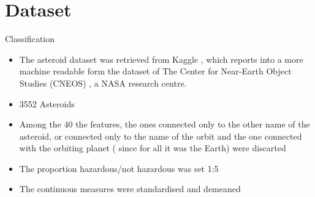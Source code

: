\documentclass{beamer}
\begin{document}
\section{Dataset}

\begin{frame}{Classification}
\begin{itemize}


\item The asteroid dataset was retrieved from Kaggle \cite{kaggle_dataset}, which reports into a more machine readable form the dataset of The Center for Near-Earth Object Studies (CNEOS) \cite{cneos+nasa}, a NASA research centre.

\item 3552 Asteroids

\item Among the 40 the features, the ones connected only to the other name of
the asteroid, or connected only to the name of the orbit and
the one connected with the orbiting planet ( since for all it was
the Earth) were discarted

\item The proportion hazardous/not hazardous was set 1:5  

\item The continuous measures were standardised and demeaned

\end{itemize}
\end{frame}
\end{document}
